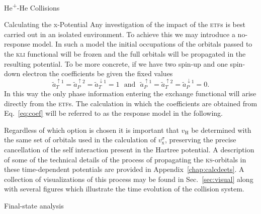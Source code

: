 \documentclass[letterpaper, 11 pt]{report}
\begin{document}
\begin{chapter}{\texorpdfstring{He\textsuperscript{+}}{He+}-He Collisions \label{chap:hephe}}
\begin{section}{Calculating the x-Potential \label{sec:pot}}
      Any investigation of the impact of the \textsc{etf}s is best carried out in an isolated
      environment. To achieve this we may introduce a no-response model. In such a model the initial
      occupations of the orbitals passed to the \textsc{kli} functional will be frozen and the full
      orbitals will be propagated in the resulting potential. To be more concrete, if we have two
      spin-up and one spin-down electron the coefficients be given the fixed values
      \begin{equation} \label{eq:noresp}
         \tilde{a}^{\uparrow 1}_T = \tilde{a}^{\uparrow 2}_P = \tilde{a}^{\downarrow 1}_T  = 1
         ~~~ \mbox{and} ~~~
         \tilde{a}^{\uparrow 1}_P = \tilde{a}^{\uparrow 2}_T = \tilde{a}^{\downarrow 1}_P  = 0.
      \end{equation}
      In this way the only phase information entering the exchange functional will arise directly from
      the \textsc{etf}s. The calculation in which the coefficients are obtained from Eq.~\eqref{eq:coef}
      will be referred to as the response model in the following.

      Regardless of which option is chosen it is important that $v_\mathrm{H}$ be determined with the
      same set of orbitals used in the calculation of $v_\mathrm{x}^\sigma$, preserving the precise
      cancellation of the self interaction present in the Hartree potential. A description of some of
      the technical details of the process of propagating the \textsc{ks}-orbitals in these
      time-dependent potentials are provided in Appendix~\ref{chap:calcdeets}. A collection of
      visualizations of this process may be found in Sec.~\ref{sec:visual} along with several figures
      which illustrate the time evolution of the collision system.

   \end{section}

   \begin{section}{Final-state analysis \label{sec:hephe-det}}


\end{section}
\end{chapter}
\end{document}
